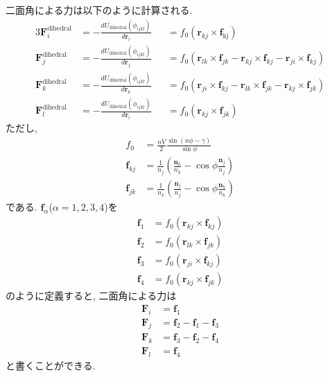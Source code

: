 二面角による力は以下のように計算される. 
\begin{alignat}{3}
     \bm{F}_{i}^{\mathrm{dihedral}}
 &=
    -\frac{d U_{\mathrm{dihedral}}(\phi_{ijkl})}{d \bm{r}_{i}}
 &&=
     f_{0} (\bm{r}_{kj} \times \bm{f}_{\mathrm{kj}})
 \label{eq:BioModel21}
 \\
     \bm{F}_{j}^{\mathrm{dihedral}}
 &=
    -\frac{d U_{\mathrm{dihedral}}(\phi_{ijkl})}{d \bm{r}_{j}}
 &&=
     f_{0}
     \left( \bm{r}_{lk} \times \bm{f}_{jk}
           -\bm{r}_{kj} \times \bm{f}_{kj}
           -\bm{r}_{ji} \times \bm{f}_{kj}
     \right)
 \label{eq:BioModel22}
 \\
     \bm{F}_{k}^{\mathrm{dihedral}}
 &=
    -\frac{d U_{\mathrm{dihedral}}(\phi_{ijkl})}{d \bm{r}_{k}}
 &&=
    f_{0}
    \left( \bm{r}_{ji} \times \bm{f}_{kj}
          -\bm{r}_{lk} \times \bm{f}_{jk}
          -\bm{r}_{kj} \times \bm{f}_{jk}
    \right)
 \label{eq:BioModel23}
 \\
 \bm{F}_{l}^{\mathrm{dihedral}}
 &=
     -\frac{d U_{\mathrm{dihedral}}(\phi_{ijkl})}{d \bm{r}_{l}}
 &&=
     f_{0} ( \bm{r}_{kj} \times \bm{f}_{jk} )
 \label{eq:BioModel24}
\end{alignat}
ただし, 
\begin{align}
 f_{0}
 &=
    \frac{nV}{2} \frac{\sin(n \phi - \gamma)}{\sin \phi}
 \label{eq:BioModel25}
 \\
 \bm{f}_{kj}
 &=
    \frac{1}{n_{j}}
    \left(
           \frac{\bm{n}_{k}}{n_{k}} - \cos \phi \frac{\bm{n}_{j}}{n_{j}}
    \right)
 \label{eq:BioModel26}
 \\
 \bm{f}_{jk}
 &=
    \frac{1}{n_{k}}
    \left(
          \frac{\bm{n}_{j}}{n_{j}} - \cos \phi \frac{\bm{n}_{k}}{n_{k}}
    \right)
 \label{eq:BioModel27}
\end{align}
である. $\bm{f}_{\alpha}$($\alpha = 1, 2, 3, 4$)を
\begin{align}
 \bm{f}_{1} &= f_{0} ( \bm{r}_{kj} \times \bm{f}_{kj}) \\
 \bm{f}_{2} &= f_{0} ( \bm{r}_{lk} \times \bm{f}_{jk}) \\
 \bm{f}_{3} &= f_{0} ( \bm{r}_{ji} \times \bm{f}_{kj}) \\
 \bm{f}_{4} &= f_{0} ( \bm{r}_{kj} \times \bm{f}_{jk})
\end{align}
のように定義すると, 二面角による力は
\begin{align}
 \bm{F}_{i} &= \bm{f}_{1} \\
 \bm{F}_{j} &= \bm{f}_{2} - \bm{f}_{1} - \bm{f}_{3} \\
 \bm{F}_{k} &= \bm{f}_{3} - \bm{f}_{2} - \bm{f}_{4} \\
 \bm{F}_{l} &= \bm{f}_{4}
\end{align}
と書くことができる. 
 
